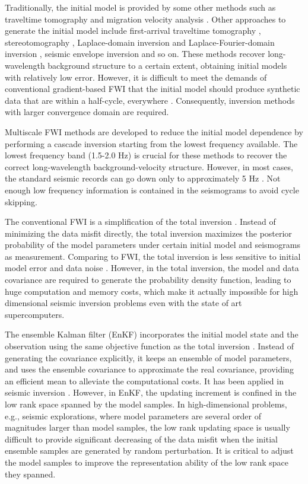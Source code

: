 \documentclass[mreferee]{gji}
\begin{document}
Traditionally, the initial model is provided by some other methods such as traveltime tomography \cite{ls,pg,ss,pc,op,wo,wa} and migration velocity analysis \cite{al,sc,sb}. Other approaches to generate the initial model include first-arrival traveltime tomography \cite{ho}, stereotomography \cite{la}, Laplace-domain inversion and Laplace-Fourier-domain inversion \cite{sc08,sc09}, seismic envelope inversion \cite{wu,lw} and so on. These methods recover long-wavelength background structure to a certain extent, obtaining initial models with relatively low error. However, it is difficult to meet the demands of conventional gradient-based FWI that the initial model should produce synthetic data that are within a half-cycle, everywhere \cite{al}. Consequently, inversion methods with larger convergence domain are required.

Multiscale FWI methods \cite{bu,ra,vigh} are developed to reduce the initial model dependence by performing a cascade inversion starting from the lowest frequency available. The lowest frequency band (1.5-2.0 Hz) is crucial for these methods to recover the correct long-wavelength background-velocity structure. However, in most cases, the standard seismic records can go down only to approximately 5 Hz \cite{wu}. Not enough low frequency information is contained in the seismograms to avoid cycle skipping.

The conventional FWI is a simplification of the total inversion \cite{ta82}. Instead of minimizing the data misfit directly, the total inversion maximizes the posterior probability of the model parameters under certain initial model and seismograms as measurement. Comparing to FWI, the total inversion is less sensitive to initial model error and data noise \cite{ta84}. However, in the total inversion, the model and data covariance are required to generate the probability density function, leading to huge computation and memory costs, which make it actually impossible for high dimensional seismic inversion problems even with the state of art supercomputers.

The ensemble Kalman filter (EnKF) incorporates the initial model state and the observation using the same objective function as the total inversion \cite{ev94,ev03,ev09}. Instead of generating the covariance explicitly, it keeps an ensemble of model parameters, and uses the ensemble covariance to approximate the real covariance, providing an efficient mean to alleviate the computational costs. It has been applied in seismic inversion \cite{ji,qh}. However, in EnKF, the updating increment is confined in the low rank space spanned by the model samples. In high-dimensional problems, e.g., seismic explorations, where model parameters are several order of magnitudes larger than model samples, the low rank updating space is usually difficult to provide significant decreasing of the data misfit when the initial ensemble samples are generated by random perturbation. It is critical to adjust the model samples to improve the representation ability of the low rank space they spanned.
\end{document}
